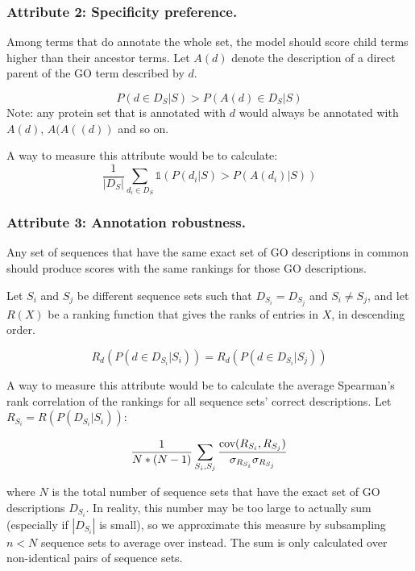 \documentclass{specification}
\begin{document}
        \subsubsection{Attribute 2: Specificity preference.}

        Among terms that do annotate the whole set, the model should score child terms higher than their ancestor terms.
Let $A(d)$ denote the description of a direct parent of the GO term described by $d$.

        \[P(d \in D_{S}| S) > P(A(d) \in D_{S}| S)\]
        Note: any protein set that is annotated with $d$ would always be annotated with $A(d)$, $A(A((d))$ and so on.

        A way to measure this attribute would be to calculate:
        \[\frac{1}{|D_{S}|}\sum_{d_i \in D_{S}} \mathds{1}(P(d_i | S) > P(A(d_i) | S))\]

        \subsubsection{Attribute 3: Annotation robustness.}

        Any set of sequences that have the same exact set of GO descriptions in common should produce scores with the same rankings for those GO descriptions.

        Let $S_i$ and $S_j$ be different sequence sets such that $D_{S_i} = D_{S_j}$ and $S_i \neq S_j$, and let $R(X)$ be a ranking function that gives the ranks of entries in $X$, in descending order.

        \[R_{d}(P(d \in D_{S_i} | S_i)) = R_{d}(P(d \in D_{S_i} | S_j))\]

        A way to measure this attribute would be to calculate the average Spearman's rank correlation of the rankings for all sequence sets' correct descriptions.
Let $R_{S_i} = R(P(D_{S_i} | S_i))$:

        \[\frac{1}{N*(N-1)}\sum_{S_i, S_j} \frac{\textnormal{cov}(R_{S_i}, R_{S_j})}{\sigma_{R_{S_i}}\sigma_{R_{S_j}}}\]

        where $N$ is the total number of sequence sets that have the exact set of GO descriptions $D_{S_i}$.
In reality, this number may be too large to actually sum (especially if $|D_{S_i}|$ is small), so we approximate this measure by subsampling $n < N$ sequence sets to average over instead.
The sum is only calculated over non-identical pairs of sequence sets.
\end{document}

